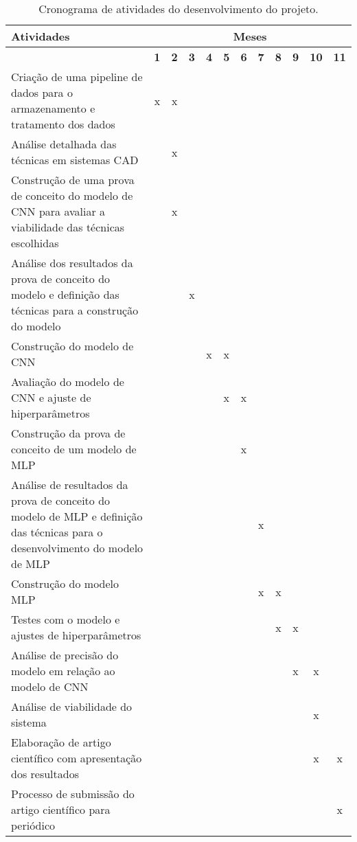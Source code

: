 \begin{table}[h!]
\centering
\setlength{\arrayrulewidth}{0.8pt}
\setlength{\tabcolsep}{5pt}
\renewcommand{\arraystretch}{1.2}


\small
\centering\begin{tabular}{|p{9cm}|*{11}{c|}}
\hline
\textbf{Atividades} & \multicolumn{11}{c|}{\textbf{Meses}} \\
\hline
  &
\textbf{1} & \textbf{2} & \textbf{3} & \textbf{4} & \textbf{5} & \textbf{6} & \textbf{7} & \textbf{8} & \textbf{9} & \textbf{10} & \textbf{11} \\ 
\hline
Criação de uma pipeline de dados para o armazenamento e tratamento dos dados & x & x &   &   &   &   &   &   &   &   &   \\ \hline
Análise detalhada das técnicas em sistemas CAD                              &   & x &   &   &   &   &   &   &   &   &   \\ \hline
Construção de uma prova de conceito do modelo de CNN para avaliar a viabilidade das técnicas escolhidas &   & x &   &   &   &   &   &   &   &   &   \\ \hline
Análise dos resultados da prova de conceito do modelo e definição das técnicas para a construção do modelo &   &   & x &   &   &   &   &   &   &   &   \\ \hline
Construção do modelo de CNN                                                &   &   &   & x & x &   &   &   &   &   &   \\ \hline
Avaliação do modelo de CNN e ajuste de hiperparâmetros                     &   &   &   &   & x & x &   &   &   &   &   \\ \hline
Construção da prova de conceito de um modelo de MLP                        &   &   &   &   &   & x &   &   &   &   &   \\ \hline
Análise de resultados da prova de conceito do modelo de MLP e definição das técnicas para o desenvolvimento do modelo de MLP &   &   &   &   &   &   & x &   &   &   &   \\ \hline
Construção do modelo MLP                                                   &   &   &   &   &   &   & x & x &   &   &   \\ \hline
Testes com o modelo e ajustes de hiperparâmetros                           &   &   &   &   &   &   &   & x & x &   &   \\ \hline
Análise de precisão do modelo em relação ao modelo de CNN                  &   &   &   &   &   &   &   &   & x & x &   \\ \hline
Análise de viabilidade do sistema                                          &   &   &   &   &   &   &   &   &   & x &   \\ \hline
Elaboração de artigo científico com apresentação dos resultados            &   &   &   &   &   &   &   &   &   & x & x \\ \hline
Processo de submissão do artigo científico para periódico                  &   &   &   &   &   &   &   &   &   &   & x \\ \hline
\end{tabular}
\caption{Cronograma de atividades do desenvolvimento do projeto.}
\label{cronograma}
\end{table}



